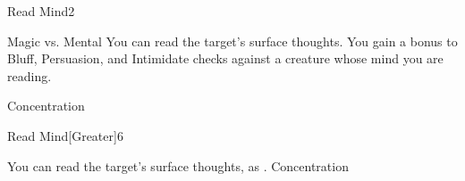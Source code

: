 \begin{spellsection}{Read Mind}{2}
    \begin{spellheader}
    \end{spellheader}
    \begin{spellcontent}
        \begin{spelltargetinginfo}
        \end{spelltargetinginfo}
        \begin{spelleffects}
            \begin{spellattack}{Magic vs. Mental}
                \spellsuccess You can read the target's surface thoughts. You gain a  bonus to Bluff, Persuasion, and Intimidate checks against a creature whose mind you are reading.
            \end{spellattack}
            \spelldur Concentration
        \end{spelleffects}
    \end{spellcontent}
    \begin{spellfooter}
        \miscastrandom
    \end{spellfooter}
\end{spellsection}

\begin{spellsection}{Read Mind}[Greater]{6}
    \begin{spellheader}
    \end{spellheader}
    \begin{spellcontent}
        \begin{spelltargetinginfo}
        \end{spelltargetinginfo}
        \begin{spelleffects}
            \spelleffect You can read the target's surface thoughts, as .
            \spelldur Concentration
        \end{spelleffects}
    \end{spellcontent}
    \begin{spellfooter}
        \miscastrandom
    \end{spellfooter}
\end{spellsection}

